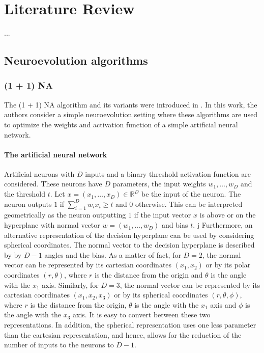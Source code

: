 \chapter{Literature Review}
\label{chap:review}

...

\section{Neuroevolution algorithms}

\subsection{(1 + 1) NA}

The (1 + 1) NA algorithm and its variants were introduced in \cite{na}.
In this work, the authors consider a simple neuroevolution setting where these algorithms are used to optimize the weights and activation function of
a simple artificial neural network.

\subsubsection{The artificial neural network}

Artificial neurons with $D$ inputs and a binary threshold activation function are considered.
These neurons have $D$ parameters, the input weights $w_1, \ldots, w_D$ and the threshold $t$.
Let $x = (x_1, \ldots, x_D) \in \mathds{R}^D$ be the input of the neuron. The neuron outputs $1$ if $\sum_{i=1}^D w_i x_i \geq t$ and $0$
otherwise.
This can be interpreted geometrically as the neuron outputting $1$ if the input vector $x$ is above or on the hyperplane with normal vector
$w = (w_1, \ldots, w_D)$ and bias $t$.
j
Furthermore, an alternative representation of the decision hyperplane can be used by considering spherical coordinates.
The normal vector to the decision hyperplane is described by by $D - 1$ angles and the bias.
As a matter of fact, for $D = 2$, the normal vector can be represented by its cartesian coordinates $(x_1, x_2)$ or by its polar coordinates
$(r, \theta)$, where $r$ is the distance from the origin and $\theta$ is the angle with the $x_1$ axis. Similarly, for $D = 3$, the normal vector can
be represented by its cartesian coordinates $(x_1, x_2, x_3)$ or by its spherical coordinates $(r, \theta, \phi)$, where $r$ is the distance from the
origin, $\theta$ is the angle with the $x_1$ axis and $\phi$ is the angle with the $x_3$ axis.
It is easy to convert between these two representations. In addition, the spherical representation uses one less parameter than the cartesian
representation, and hence, allows for the reduction of the number of inputs to the neurons to $D - 1$.

